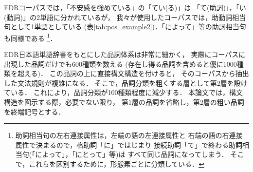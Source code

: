 EDRコーパスでは，「不安感を強めている」の「てい(る)」は
「て(助詞)」，「い(動詞)」の2単語に分かれているが，
我々が使用したコーパスでは，助動詞相当句として1単語としている
(表\ref{tab:pos_example2})．「によって」等の助詞相当句も同様である
\footnote{助詞相当句の左右連接属性は，左端の語の左連接属性と
右端の語の右連接属性で決まるので，格助詞「に」ではじまり
接続助詞「て」で終わる助詞相当句(「によって」，「にとって」等)は
すべて同じ品詞になってしまう．
そこで，これらを区別するために，形態素ごとに分類している．}．

EDR日本語単語辞書をもとにした品詞体系は非常に細かく，
実際にコーパスに出現した品詞だけでも600種類を数える
(存在し得る品詞を含めると優に1000種類を超える)．
この品詞の上に直接構文構造を付けると，
そのコーパスから抽出した文法規則が複雑になる．
そこで，品詞分類を粗くする層として第2層を設けている．
これにより，品詞分類が100種類程度に減少する．
本論文では，構文構造を図示する際，必要でない限り，
第1層の品詞を省略し，第2層の粗い品詞を終端記号とする．

